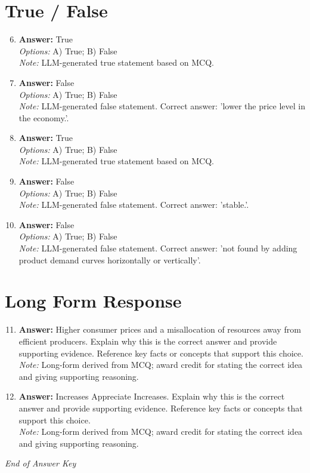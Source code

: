 \documentclass[12pt]{article}
\begin{document}
\section*{True / False}
\begin{enumerate}[label=\arabic*.]
\setcounter{enumi}{5}
\item \textbf{Answer:} True
\\ \textit{Options:} A) True; B) False
\\ \textit{Note:} LLM-generated true statement based on MCQ.
\item \textbf{Answer:} False
\\ \textit{Options:} A) True; B) False
\\ \textit{Note:} LLM-generated false statement. Correct answer: 'lower the price level in the economy.'.
\item \textbf{Answer:} True
\\ \textit{Options:} A) True; B) False
\\ \textit{Note:} LLM-generated true statement based on MCQ.
\item \textbf{Answer:} False
\\ \textit{Options:} A) True; B) False
\\ \textit{Note:} LLM-generated false statement. Correct answer: 'stable.'.
\item \textbf{Answer:} False
\\ \textit{Options:} A) True; B) False
\\ \textit{Note:} LLM-generated false statement. Correct answer: 'not found by adding product demand curves horizontally or vertically'.
\end{enumerate}

\section*{Long Form Response}
\begin{enumerate}[label=\arabic*.]
\setcounter{enumi}{10}
\item \textbf{Answer:} Higher consumer prices and a misallocation of resources away from efficient producers. Explain why this is the correct answer and provide supporting evidence. Reference key facts or concepts that support this choice.
\\ \textit{Note:} Long-form derived from MCQ; award credit for stating the correct idea and giving supporting reasoning.
\item \textbf{Answer:} Increases Appreciate Increases. Explain why this is the correct answer and provide supporting evidence. Reference key facts or concepts that support this choice.
\\ \textit{Note:} Long-form derived from MCQ; award credit for stating the correct idea and giving supporting reasoning.
\end{enumerate}

\vfill
\noindent\textit{End of Answer Key}
\end{document}
